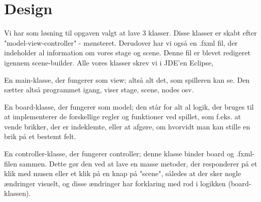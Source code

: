\section{Design}
Vi har som løsning til opgaven valgt at lave 3 klasser. Disse klasser er skabt efter "model-view-controller" - mønsteret. Derudover har vi også en .fxml fil, der indeholder al information om vores stage og scene. Denne fil er blevet redigeret igennem scene-builder. Alle vores klasser skrev vi i JDE'en Eclipse, 

En main-klasse, der fungerer som view; altså alt det, som spilleren kan se. Den sætter altså programmet igang, viser stage, scene, nodes osv. 

En board-klasse, der fungerer som model; den står for alt al logik, der bruges til at implementerer de forskellige regler og funktioner ved spillet, som f.eks. at vende brikker, der er indeklemte, eller at afgøre, om hvorvidt man kan stille en brik på et bestemt felt. 

En controller-klasse, der fungerer controller; denne klasse binder board og .fxml-filen sammen. Dette gør den ved at lave en masse metoder, der responderer på et klik med musen eller et klik på en knap på "scene", således at der sker nogle ændringer visuelt, og disse ændringer har forklaring med rod i logikken (board-klassen).